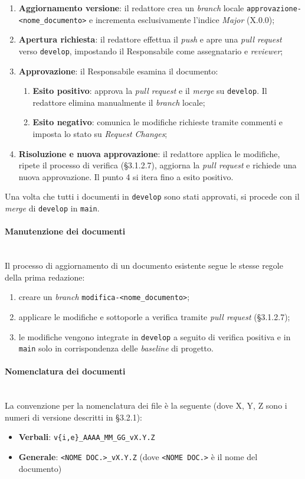 \documentclass[10pt, letterpaper]{article}
\newcommand{\trisubsection}[1]{\paragraph{#1}\mbox{}\\}
\begin{document}
\begin{enumerate}
    \item \textbf{Aggiornamento versione}: il redattore crea un \textit{branch} locale \texttt{approvazione-<nome\_documento>} e incrementa esclusivamente l'indice \textit{Major} (X.0.0);
    \item \textbf{Apertura richiesta}: il redattore effettua il \textit{push} e apre una \textit{pull request} verso \texttt{develop}, impostando il Responsabile come assegnatario e \textit{reviewer};
    \item \textbf{Approvazione}: il Responsabile esamina il documento:
    \begin{enumerate}
        \item \textbf{Esito positivo}: approva la \textit{pull request} e il \textit{merge} su \texttt{develop}. Il redattore elimina manualmente il \textit{branch} locale;
        \item \textbf{Esito negativo}: comunica le modifiche richieste tramite commenti e imposta lo stato su \textit{Request Changes};
    \end{enumerate}
    \item \textbf{Risoluzione e nuova approvazione}: il redattore applica le modifiche, ripete il processo di verifica (§3.1.2.7), aggiorna la \textit{pull request} e richiede una nuova approvazione. Il punto 4 si itera fino a esito positivo.
\end{enumerate}
Una volta che tutti i documenti in \texttt{develop} sono stati approvati, si procede con il \textit{merge} di \texttt{develop} in \texttt{main}.

\trisubsection{Manutenzione dei documenti}
Il processo di aggiornamento di un documento esistente segue le stesse regole della prima redazione:
\begin{enumerate}
    \item creare un \textit{branch} \texttt{modifica-<nome\_documento>};
    \item applicare le modifiche e sottoporle a verifica tramite \textit{pull request} (§3.1.2.7);
    \item le modifiche vengono integrate in \texttt{develop} a seguito di verifica positiva e in \texttt{main} solo in corrispondenza delle \textit{baseline} di progetto.
\end{enumerate}

\trisubsection{Nomenclatura dei documenti}
La convenzione per la nomenclatura dei file è la seguente (dove X, Y, Z sono i numeri di versione descritti in §3.2.1):
\begin{itemize}
    \item \textbf{Verbali}: \texttt{v\{i,e\}\_AAAA\_MM\_GG\_vX.Y.Z}
    \item \textbf{Generale}: \texttt{<NOME DOC.>\_vX.Y.Z} (dove \texttt{<NOME DOC.>} è il nome del documento)
\end{itemize}
\end{document}
